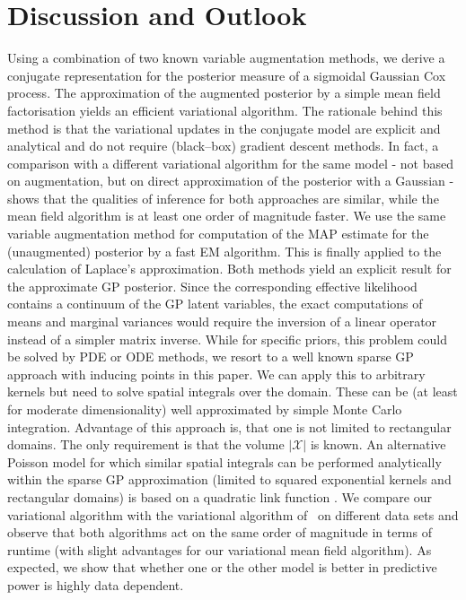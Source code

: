 \documentclass[twoside,11pt]{article}
\newcommand{\X}{\mathcal{X}}
\begin{document}
\section{Discussion and Outlook}\label{sec:discussion}
Using a combination of two known variable augmentation methods, we 
derive a conjugate representation for the posterior measure of a sigmoidal Gaussian Cox process.
The approximation of the augmented posterior by a simple mean field factorisation yields an efficient 
variational algorithm. The rationale behind this method is that the variational updates in the conjugate
model are explicit and analytical and do not require (black--box) gradient descent methods.
In fact, a comparison with a different variational algorithm for the same model - not based on augmentation, but on 
direct approximation of the posterior with a Gaussian - shows that the qualities of inference for both 
approaches are similar, while the mean field algorithm is at least one order of magnitude faster.
We use the same variable augmentation method for computation of the MAP estimate 
for the (unaugmented) posterior by a fast EM algorithm. This is finally applied to the calculation
of Laplace's approximation. Both methods yield an explicit result for the approximate 
GP posterior. Since the corresponding effective likelihood contains a continuum of the GP 
latent variables, the exact computations of means and marginal variances would require 
the inversion of a linear operator instead of a simpler matrix inverse. While for specific priors, 
this problem could be solved by PDE or ODE methods, we resort to a well known sparse GP approach with inducing points in this paper. We can apply this to arbitrary kernels but need to solve spatial integrals over the domain. These can be (at least for moderate dimensionality) well approximated by simple Monte Carlo integration. Advantage of this approach is, that one is not limited to rectangular domains. The only requirement is that the volume $|\X|$ is known. An alternative Poisson model for which similar spatial integrals can be performed analytically \citep{lloyd2015variational} within the sparse GP approximation (limited to squared exponential kernels and rectangular domains) is based on a quadratic link function
\citep{lloyd2015variational,flaxman2017poisson,john2018large}. We compare our variational algorithm with the variational algorithm of~\citet{lloyd2015variational} on different data sets and observe that both algorithms act on the same order of magnitude in terms of runtime (with slight advantages for our variational mean field algorithm). As expected, we show that whether one or the other model is better in predictive power is highly data dependent.
\end{document}
